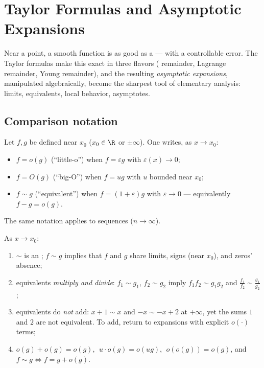 \chapter{Taylor Formulas and Asymptotic Expansions}\label{ch:b1:taylor}

Near a point, a smooth function is as good as a  --- with a
controllable error. The Taylor formulas make this exact in three
flavors ( remainder, Lagrange remainder, Young remainder),
and the resulting \emph{asymptotic expansions}, manipulated
algebraically, become the sharpest tool of elementary analysis:
limits, equivalents, local behavior, asymptotes.

\section{Comparison notation}

\begin{definition}\label{def:b1:taylor:landau}
Let $f, g$ be defined near $x_0$ ($x_0 \in \R$ or $\pm\infty$). One
writes, as $x \to x_0$:
\begin{itemize}
  \item $f = o(g)$ (``little-o'') when $f = \varepsilon g$ with
        $\varepsilon(x) \to 0$;
  \item $f = O(g)$ (``big-O'') when $f = u g$ with $u$ bounded near
        $x_0$;
  \item $f \sim g$ (``equivalent'') when
        $f = (1 + \varepsilon) g$ with $\varepsilon \to 0$ ---
        equivalently $f - g = o(g)$.
\end{itemize}
The same notation applies to sequences ($n \to \infty$).
\end{definition}

\begin{proposition}[Rules]\label{prop:b1:taylor:landaurules}
As $x \to x_0$:
\begin{enumerate}
  \item $\sim$ is an ; $f \sim g$ implies that
        $f$ and $g$ share limits, signs (near $x_0$), and zeros'
        absence;
  \item equivalents \emph{multiply and divide}: $f_1 \sim g_1$, $f_2
        \sim g_2$ imply $f_1 f_2 \sim g_1 g_2$ and $\frac{f_1}{f_2}
        \sim \frac{g_1}{g_2}$;
  \item equivalents do \emph{not} add: $x + 1 \sim x$ and $-x \sim
        -x + 2$ at $+\infty$, yet the sums $1$ and $2$ are not
        equivalent. To add, return to expansions with explicit
        $o(\cdot)$ terms;
  \item $o(g) + o(g) = o(g)$, $\;u \cdot o(g) = o(ug)$, $\;o(o(g)) =
        o(g)$, and $f \sim g \iff f = g + o(g)$.
\end{enumerate}
\end{proposition}

